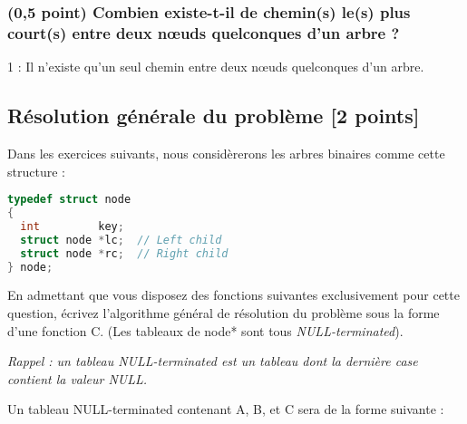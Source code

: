 \documentclass[11pt,a4paper]{article}
\begin{document}
\subsubsection{(0,5 point) Combien existe-t-il de chemin(s) le(s) plus court(s) entre deux nœuds quelconques d'un arbre ?}

1 : Il n'existe qu'un seul chemin entre deux nœuds quelconques d'un arbre.


%


\clearpage


\subsection{Résolution générale du problème [2 points]}

\noindent Dans les exercices suivants, nous considèrerons les arbres binaires comme cette structure  :

\begin{center}
\begin{lstlisting}[language=C,commentstyle=\color{teal}\ttfamily,morekeywords={node}]
typedef struct node
{
  int         key;
  struct node *lc;  // Left child
  struct node *rc;  // Right child
} node;
\end{lstlisting}
\end{center}

\noindent En admettant que vous disposez des fonctions suivantes exclusivement pour cette question, écrivez l'algorithme général de résolution du problème sous la forme d'une fonction C.
(Les tableaux de node* sont tous \textit{NULL-terminated}).

\medskip

\noindent \textit{Rappel : un tableau NULL-terminated est un tableau dont la dernière case contient la valeur NULL.}

\medskip

\setlength\fboxrule{0.2pt}
\noindent Un tableau NULL-terminated contenant A, B, et C sera de la forme suivante : 
\setlength\fboxrule{0.4pt}
\end{document}

